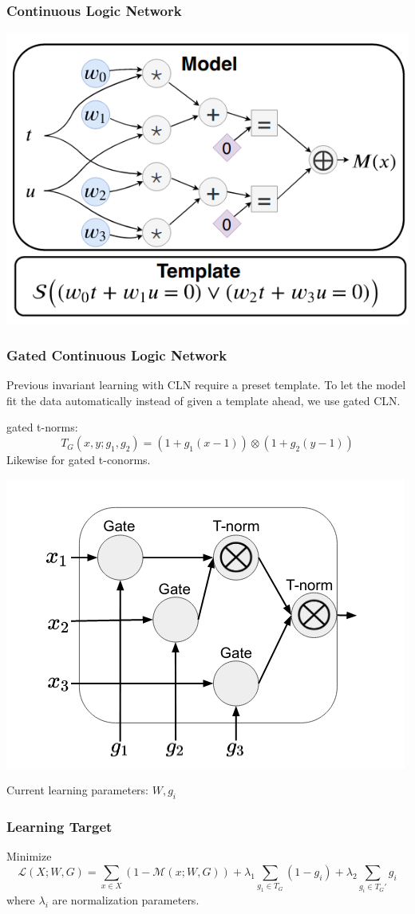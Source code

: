 \documentclass[11pt]{beamer}
\begin{document}
\begin{frame}\frametitle{Continuous Logic Network}
\begin{example}
\begin{center}
\includegraphics[scale=0.4]{1.png}
\end{center}
\end{example}
\end{frame}

\begin{frame}\frametitle{Gated Continuous Logic Network}
Previous invariant learning with CLN require a preset template. To let the model fit the data automatically instead of given a template ahead, we use gated CLN.

gated t-norms:
\[T_G(x,y;g_1,g_2) = (1 + g_1(x - 1))\otimes (1 + g_2(y - 1)) \]
Likewise for gated t-conorms.

\begin{center}
\includegraphics[scale=0.35]{7.png}
\end{center}
Current learning parameters: $W, g_i$
\end{frame}
\begin{frame}\frametitle{Learning Target}
Minimize
\[\mathcal{L}(X; W,G) = \sum_{x\in X}(1 - \mathcal{M}(x; W,G)) + \lambda_1\sum_{g_1\in T_G}(1 - g_i) + \lambda_2 \sum_{g_i\in T_G' }g_i\]
where $\lambda_i$ are normalization parameters.
\end{frame}
\end{document}
